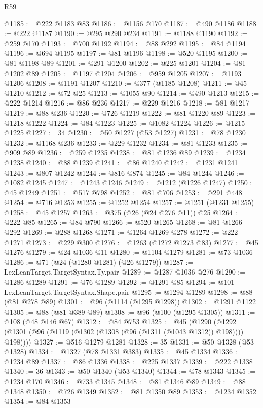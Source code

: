 \begin{lexlean}{R59}
\begin{coremodule}
@1185 := @222 @1183 @83
@1186 := @1156 @170
@1187 := @490 @1186
@1188 := @222 @1187
@1190 := @295 @290 @234
@1191 := @1188 @1190
@1192 := @259 @170
@1193 := @700 @1192
@1194 := @88 @292
@1195 := @84 @1194
@1196 := @694 @1195
@1197 := @81 @1196
@1198 := @520 @1195
@1200 := @81 @1198 @89
@1201 := @291 @1200
@1202 := @225 @1201
@1204 := @81 @1202 @89
@1205 := @1197 @1204
@1206 := @959 @1205
@1207 := @1193 @1206
@1208 := @1191 @1207
@1210 := @377 (@1185 @1208)
@1211 := @45 @1210
@1212 := @72 @25
@1213 := @1055 @90
@1214 := @490 @1213
@1215 := @222 @1214
@1216 := @86 @236
@1217 := @229 @1216
@1218 := @81 @1217
@1219 := @88 @236
@1220 := @726 @1219
@1222 := @81 @1220 @89
@1223 := @1218 @1222
@1224 := @84 @1223
@1225 := @1082 @1224
@1226 := @1215 @1225
@1227 := 34
@1230 := @50 @1227 (@53 @1227)
@1231 := @78 @1230
@1232 := @1168 @236
@1233 := @229 @1232
@1234 := @81 @1233
@1235 := @909 @89
@1236 := @259 @1235
@1238 := @81 @1236 @89
@1239 := @1234 @1238
@1240 := @88 @1239
@1241 := @86 @1240
@1242 := @1231 @1241
@1243 := @807 @1242
@1244 := @816 @874
@1245 := @84 @1244
@1246 := @1082 @1245
@1247 := @1243 @1246
@1249 := @1212 (@1226 @1247)
@1250 := @45 @1249
@1251 := @517 @798
@1252 := @81 @706
@1253 := @291 @448
@1254 := @716 @1253
@1255 := @1252 @1254
@1257 := @1251 (@1231 @1255)
@1258 := @45 @1257
@1263 := @375 (@26 (@24 @276 @11)) @25
@1264 := @222 @85
@1265 := @84 @790
@1266 := @520 @1265
@1268 := @81 @1266 @292
@1269 := @288 @1268
@1271 := @1264 @1269 @278
@1272 := @222 @1271
@1273 := @229 @300
@1276 := @1263 (@1272 @1273 @83)
@1277 := @45 @1276
@1279 := @24 @1036 @11
@1280 := @1104 @1279
@1281 := @73 @1036
@1286 := @71 (@24 (@1280 @1281) (@26 @1279))
@1287 := LexLeanTarget.TargetSyntax.Ty.pair
@1289 := @1287 @1036 @276
@1290 := @1286 @1289
@1291 := @76 @1289
@1292 := @1291 @85
@1294 := @101 LexLeanTarget.TargetSyntax.Shape.pair
@1295 := @1294 @1289
@1298 := @88 (@81 @278 @89)
@1301 := @96 (@1114 (@1295 @1298))
@1302 := @1291 @1122
@1305 := @88 (@81 @389 @89)
@1308 := @96 (@100 (@1295 @1305))
@1311 := @108 (@48 @146 @67)
@1312 := @84 @753
@1325 := @45
    (@1290 (@1292 (@1301 (@96 (@1119 (@1302 (@1308 (@96 (@1311 (@1043 @1312)) @198)))) @198))))
@1327 := @516 @1279 @1281
@1328 := 35
@1331 := @50 @1328 (@53 @1328)
@1334 := @1327 (@78 @1331 @383)
@1335 := @45 @1334
@1336 := @1234 @89
@1337 := @86 @1336
@1338 := @225 @1337
@1339 := @222 @1338
@1340 := 36
@1343 := @50 @1340 (@53 @1340)
@1344 := @78 @1343
@1345 := @1234 @170
@1346 := @733 @1345
@1348 := @81 @1346 @89
@1349 := @88 @1348
@1350 := @726 @1349
@1352 := @81 @1350 @89
@1353 := @1234 @1352
@1354 := @84 @1353

\end{coremodule}
\end{lexlean}
